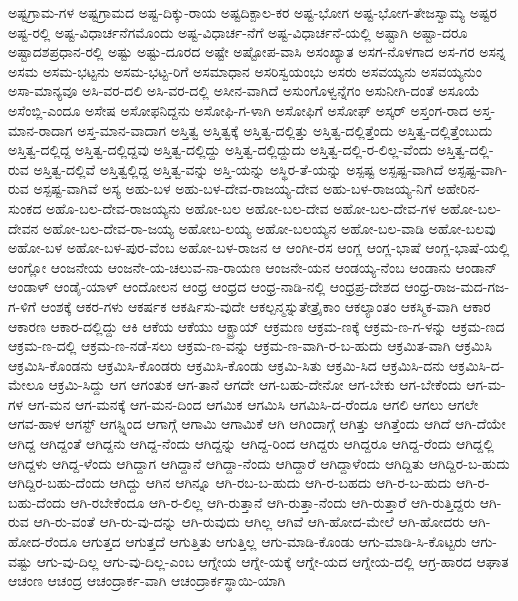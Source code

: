 ಅಷ್ಟಗ್ರಾಮ-ಗಳ
ಅಷ್ಟಗ್ರಾಮದ
ಅಷ್ಟ-ದಿಕ್ಕು-ರಾಯ
ಅಷ್ಟದಿಕ್ಪಾಲ-ಕರ
ಅಷ್ಟ-ಭೋಗ
ಅಷ್ಟ-ಭೋಗ-ತೇಜಸ್ವಾಮ್ಯ
ಅಷ್ಟರ
ಅಷ್ಟ-ರಲ್ಲಿ
ಅಷ್ಟ-ವಿಧಾರ್ಚನೆಗಮೊಂದು
ಅಷ್ಟ-ವಿಧಾರ್ಚ-ನೆಗೆ
ಅಷ್ಟ-ವಿಧಾರ್ಚನೆ-ಯಲ್ಲಿ
ಅಷ್ಟಾಗಿ
ಅಷ್ಟಾ-ದರೂ
ಅಷ್ಟಾದಶಪ್ರಧಾನ-ರಲ್ಲಿ
ಅಷ್ಟು
ಅಷ್ಟು-ದೂರದ
ಅಷ್ಟೇ
ಅಷ್ಟೋಪ-ವಾಸಿ
ಅಸಂಖ್ಯಾತ
ಅಸಗ-ನೊಳಗಾದ
ಅಸ-ಗರ
ಅಸನ್ನ
ಅಸಮ
ಅಸಮ-ಭಟ್ಟನು
ಅಸಮ-ಭಟ್ಟ-ರಿಗೆ
ಅಸಮಾಧಾನ
ಅಸರಿಸ್ವಯಂಭು
ಅಸರು
ಅಸವಯ್ಯನು
ಅಸವಯ್ಯನುಂ
ಅಸಾ-ಮಾನ್ಯವೂ
ಅಸಿ-ವರ-ದಲಿ
ಅಸಿ-ವರ-ದಲ್ಲಿ
ಅಸೀನ-ವಾಗಿದೆ
ಅಸುಂಗೊಳ್ವನ್ನೆಗಂ
ಅಸುನೀಗಿ-ದಂತೆ
ಅಸೂಯೆ
ಅಸೆಂಬ್ಲಿ-ಎಂದೂ
ಅಸೇಷ
ಅಸೋಫನಿದ್ದನು
ಅಸೋಫಿ-ಗ-ಳಾಗಿ
ಅಸೋಫಿಗೆ
ಅಸೋಫ್
ಅಸ್ಕರ್
ಅಸ್ತಂಗ-ರಾದ
ಅಸ್ತ-ಮಾನ-ರಾದಾಗ
ಅಸ್ತ-ಮಾನ-ವಾದಾಗ
ಅಸ್ತಿತ್ವ
ಅಸ್ತಿತ್ವಕ್ಕೆ
ಅಸ್ತಿತ್ವ-ದಲ್ಲಿತ್ತು
ಅಸ್ತಿತ್ವ-ದಲ್ಲಿತ್ತೆಂದು
ಅಸ್ತಿತ್ವ-ದಲ್ಲಿತ್ತೆಂಬುದು
ಅಸ್ತಿತ್ವ-ದಲ್ಲಿದ್ದ
ಅಸ್ತಿತ್ವ-ದಲ್ಲಿದ್ದವು
ಅಸ್ತಿತ್ವ-ದಲ್ಲಿದ್ದು
ಅಸ್ತಿತ್ವ-ದಲ್ಲಿದ್ದುದು
ಅಸ್ತಿತ್ವ-ದಲ್ಲಿ-ರ-ಲಿಲ್ಲ-ವೆಂದು
ಅಸ್ತಿತ್ವ-ದಲ್ಲಿ-ರುವ
ಅಸ್ತಿತ್ವ-ದಲ್ಲಿವೆ
ಅಸ್ತಿತ್ವಲ್ಲಿದ್ದ
ಅಸ್ತಿತ್ವ-ವನ್ನು
ಅಸ್ತಿ-ಯನ್ನು
ಅಸ್ಥಿರ-ತೆ-ಯನ್ನು
ಅಸ್ಪಷ್ಟ
ಅಸ್ಪಷ್ಟ-ವಾಗಿದೆ
ಅಸ್ಪಷ್ಟ-ವಾಗಿ-ರುವ
ಅಸ್ಪಷ್ಟ-ವಾಗಿವೆ
ಅಸ್ಯ
ಅಹು-ಬಳ
ಅಹು-ಬಳ-ದೇವ-ರಾಜಯ್ಯ-ದೇವ
ಅಹು-ಬಳ-ರಾಜಯ್ಯ-ನಿಗೆ
ಅಹೇರಿನ-ಸುಂಕದ
ಅಹೊ-ಬಲ-ದೇವ-ರಾಜಯ್ಯನು
ಅಹೋ-ಬಲ
ಅಹೋ-ಬಲ-ದೇವ
ಅಹೋ-ಬಲ-ದೇವ-ಗಳ
ಅಹೋ-ಬಲ-ದೇವನ
ಅಹೋ-ಬಲ-ದೇವ-ರಾ-ಜಯ್ಯ
ಅಹೋಬ-ಲಯ್ಯ
ಅಹೋ-ಬಲಯ್ಯನ
ಅಹೋ-ಬಲ-ವಾಡಿ
ಅಹೋ-ಬಲವು
ಅಹೋ-ಬಳ
ಅಹೋ-ಬಳ-ಪುರ-ವೆಂಬ
ಅಹೋ-ಬಳ-ರಾಜನ
ಆ
ಆಂಗೀ-ರಸ
ಆಂಗ್ಲ
ಆಂಗ್ಲ-ಭಾಷೆ
ಆಂಗ್ಲ-ಭಾಷೆ-ಯಲ್ಲಿ
ಆಂಗ್ಲೋ
ಆಂಜನೇಯ
ಆಂಜನೇ-ಯ-ಚಲುವ-ನಾ-ರಾಯಣ
ಆಂಜನೇ-ಯನ
ಆಂಡಯ್ಯ-ನೆಂಬ
ಆಂಡಾನು
ಆಂಡಾನ್
ಆಂಡಾಳ್
ಆಂಡೈ-ಯಾಳ್
ಆಂದೋಲನ
ಆಂಧ್ರ
ಆಂಧ್ರದ
ಆಂಧ್ರ-ನಾಡಿ-ನಲ್ಲಿ
ಆಂಧ್ರಪ್ರ-ದೇಶದ
ಆಂಧ್ರ-ರಾಜ-ಮದ-ಗಜ-ಗ-ಳಿಗೆ
ಆಂಶಕ್ಕೆ
ಆಕರ-ಗಳು
ಆಕರ್ಷಕ
ಆಕರ್ಷಿಸು-ವುದೇ
ಆಕಲ್ಪನ್ಮಸ್ನುತೇತ್ರೈಕಾಂ
ಆಕಲ್ಯಾಂತಂ
ಆಕಸ್ಮಿಕ-ವಾಗಿ
ಆಕಾರ
ಆಕಾರಣ
ಆಕಾರ-ದಲ್ಲಿದ್ದು
ಆಕಿ
ಆಕೆಯ
ಆಕೆಯು
ಆಕ್ಟ್ರಾಯ್
ಆಕ್ರಮಣ
ಆಕ್ರಮ-ಣಕ್ಕೆ
ಆಕ್ರಮ-ಣ-ಗ-ಳನ್ನು
ಆಕ್ರಮ-ಣದ
ಆಕ್ರಮ-ಣ-ದಲ್ಲಿ
ಆಕ್ರಮ-ಣ-ನಡೆ-ಸಲು
ಆಕ್ರಮ-ಣ-ವನ್ನು
ಆಕ್ರಮ-ಣ-ವಾಗಿ-ರ-ಬ-ಹುದು
ಆಕ್ರಮಿತ-ವಾಗಿ
ಆಕ್ರಮಿಸಿ
ಆಕ್ರಮಿಸಿ-ಕೊಂಡನು
ಆಕ್ರಮಿಸಿ-ಕೊಂಡರು
ಆಕ್ರಮಿಸಿ-ಕೊಂಡು
ಆಕ್ರಮಿ-ಸಿತು
ಆಕ್ರಮಿ-ಸಿದ
ಆಕ್ರಮಿಸಿ-ದನು
ಆಕ್ರಮಿಸಿ-ದ-ಮೇಲೂ
ಆಕ್ರಮಿ-ಸಿದ್ದು
ಆಗ
ಆಗಂತುಕ
ಆಗ-ತಾನೆ
ಆಗದೇ
ಆಗ-ಬಹು-ದೇನೋ
ಆಗ-ಬೇಕು
ಆಗ-ಬೇಕೆಂದು
ಆಗ-ಮ-ಗಳ
ಆಗ-ಮನ
ಆಗ-ಮನಕ್ಕೆ
ಆಗ-ಮನ-ದಿಂದ
ಆಗಮಿಕ
ಆಗಮಿಸಿ
ಆಗಮಿಸಿ-ದ-ರೆಂದೂ
ಆಗಲಿ
ಆಗಲು
ಆಗಲೇ
ಆಗವ-ಹಾಳ
ಆಗಸ್ಟ್
ಆಗಸ್ಟ್ನಿಂದ
ಆಗಾಗ್ಗೆ
ಆಗಾಮಿ
ಆಗಾಮಿಕೆ
ಆಗಿ
ಆಗಿಂದಾಗ್ಗೆ
ಆಗಿತ್ತು
ಆಗಿತ್ತೆಂದು
ಆಗಿದೆ
ಆಗಿ-ದೆಯೇ
ಆಗಿದ್ದ
ಆಗಿದ್ದಂತೆ
ಆಗಿದ್ದನು
ಆಗಿದ್ದ-ನೆಂದು
ಆಗಿದ್ದನ್ನು
ಆಗಿದ್ದ-ರಿಂದ
ಆಗಿದ್ದರು
ಆಗಿದ್ದರೂ
ಆಗಿದ್ದ-ರೆಂದು
ಆಗಿದ್ದಲ್ಲಿ
ಆಗಿದ್ದಳು
ಆಗಿದ್ದ-ಳೆಂದು
ಆಗಿದ್ದಾಗ
ಆಗಿದ್ದಾನೆ
ಆಗಿದ್ದಾ-ನೆಂದು
ಆಗಿದ್ದಾರೆ
ಆಗಿದ್ದಾಳೆಂದು
ಆಗಿದ್ದಿತು
ಆಗಿದ್ದಿರ-ಬ-ಹುದು
ಆಗಿದ್ದಿರ-ಬಹು-ದೆಂದು
ಆಗಿದ್ದು
ಆಗಿನ
ಆಗಿನ್ನೂ
ಆಗಿ-ರಬ-ಬ-ಹುದು
ಆಗಿ-ರ-ಬಹದು
ಆಗಿ-ರ-ಬ-ಹುದು
ಆಗಿ-ರ-ಬಹು-ದೆಂದು
ಆಗಿ-ರಬೇಕೆಂದೂ
ಆಗಿ-ರ-ಲಿಲ್ಲ
ಆಗಿ-ರುತ್ತಾನೆ
ಆಗಿ-ರುತ್ತಾ-ನೆಂದು
ಆಗಿ-ರುತ್ತಾರೆ
ಆಗಿ-ರುತ್ತಿದ್ದರು
ಆಗಿ-ರುವ
ಆಗಿ-ರು-ವಂತೆ
ಆಗಿ-ರು-ವು-ದನ್ನು
ಆಗಿ-ರುವುದು
ಆಗಿಲ್ಲ
ಆಗಿವೆ
ಆಗಿ-ಹೋದ-ಮೇಲೆ
ಆಗಿ-ಹೋದರು
ಆಗಿ-ಹೋದ-ರೆಂದೂ
ಆಗುತ್ತದ
ಆಗುತ್ತದೆ
ಆಗುತ್ತಿತು
ಆಗುತ್ತಿಲ್ಲ
ಆಗು-ಮಾಡಿ-ಕೊಂಡು
ಆಗು-ಮಾಡಿ-ಸಿ-ಕೊಟ್ಟರು
ಆಗು-ವಷ್ಟು
ಆಗು-ವು-ದಿಲ್ಲ
ಆಗು-ವು-ದಿಲ್ಲ-ಎಂಬ
ಆಗ್ನೇಯ
ಆಗ್ನೇ-ಯಕ್ಕೆ
ಆಗ್ನೇ-ಯದ
ಆಗ್ನೇಯ-ದಲ್ಲಿ
ಆಗ್ರ-ಹಾರದ
ಆಘಾತ
ಆಚಂಣ
ಆಚಂದ್ರ
ಆಚಂದ್ರಾರ್ಕ-ವಾಗಿ
ಆಚಂದ್ರಾರ್ಕಸ್ಥಾಯಿ-ಯಾಗಿ
